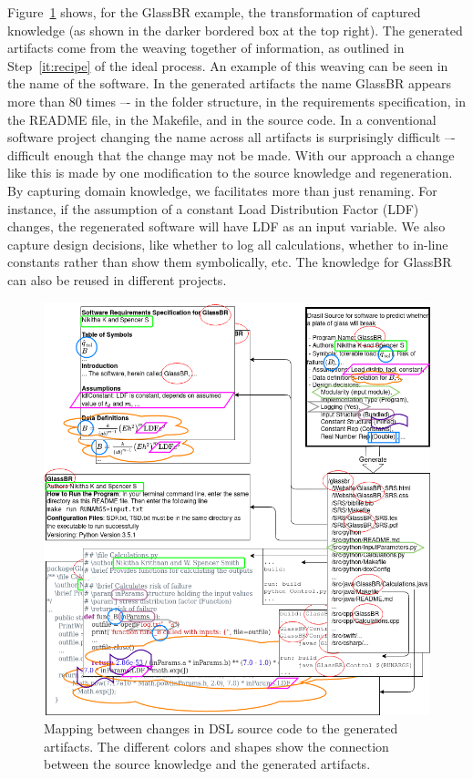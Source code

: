 \documentclass[sigconf,review]{acmart}
\begin{document}
Figure~\ref{Fig_DrasilAndChange} shows, for the GlassBR example, the
transformation of captured knowledge (as shown in the darker bordered box at the
top right). The generated artifacts come from the weaving together of
information, as outlined in Step~\ref{it:recipe} of the ideal process.  An example of this weaving can be seen in the name of the software.  In the generated artifacts the name
GlassBR appears more than 80 times –- in the folder structure, in the
requirements specification, in the README file, in the Makefile, and in the
source code. In a conventional software project changing the name across all
artifacts is surprisingly difficult –- difficult enough that the change may not be
made. With our approach a change like this is made by one modification to the
source knowledge and regeneration. By capturing domain knowledge, we facilitates
more than just renaming. For instance, if the assumption of a constant Load
Distribution Factor (LDF) changes, the regenerated software will have LDF as an
input variable. We also capture design decisions, like whether to log all
calculations, whether to in-line constants rather than show them symbolically,
etc. The knowledge for GlassBR can also be reused in different projects.

\begin{figure}[h]
  \centering
  \includegraphics[width=\linewidth]{assets/DrasilSupportsChange-right-portrait-overlapped-ungrouped-v1.drawio.png}
  \caption{Mapping between changes in DSL source code to the generated
  artifacts. The different colors and shapes show the connection between the
  source knowledge and the generated artifacts.}
  \label{Fig_DrasilAndChange}
\end{figure}
\end{document}
